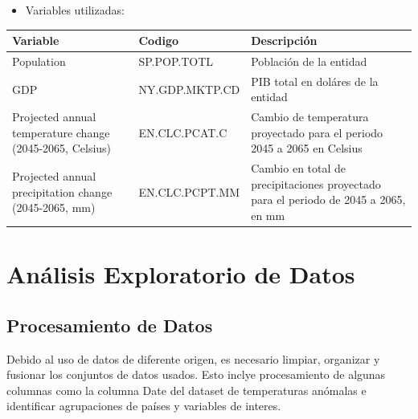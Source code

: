 \documentclass[
]{book}
\providecommand{\tightlist}{%
  \setlength{\itemsep}{0pt}\setlength{\parskip}{0pt}}
\begin{document}
\begin{tabular}{}
\hline

\hline
\end{tabular}

\begin{itemize}
\tightlist
\item
  Variables utilizadas:
\end{itemize}

\begin{longtable}[]{@{}
  >{\raggedright\arraybackslash}p{}
  >{\raggedright\arraybackslash}p{}
  >{\raggedright\arraybackslash}p{}@{}}
\toprule\noalign{}
\begin{minipage}[b]{\linewidth}\raggedright
Variable
\end{minipage} & \begin{minipage}[b]{\linewidth}\raggedright
Codigo
\end{minipage} & \begin{minipage}[b]{\linewidth}\raggedright
Descripción
\end{minipage} \\
\midrule\noalign{}
\endhead
\bottomrule\noalign{}
\endlastfoot
Population & SP.POP.TOTL & Población de la entidad \\
GDP & NY.GDP.MKTP.CD & PIB total en doláres de la entidad \\
Projected annual temperature change (2045-2065, Celsius) & EN.CLC.PCAT.C & Cambio de temperatura proyectado para el periodo 2045 a 2065 en Celsius \\
Projected annual precipitation change (2045-2065, mm) & EN.CLC.PCPT.MM & Cambio en total de precipitaciones proyectado para el periodo de 2045 a 2065, en mm \\
\end{longtable}

\chapter{Análisis Exploratorio de Datos}\label{anuxe1lisis-exploratorio-de-datos}

\section{Procesamiento de Datos}\label{procesamiento-de-datos-1}

Debido al uso de datos de diferente origen, es necesario limpiar, organizar y fusionar los conjuntos de datos usados. Esto inclye procesamiento de algunas columnas como la columna Date del dataset de temperaturas anómalas e identificar agrupaciones de países y variables de interes.
\end{document}
